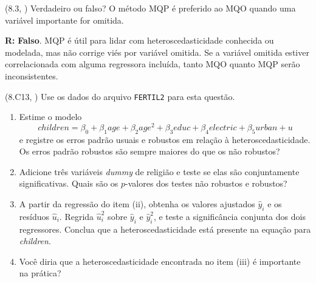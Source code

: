 \documentclass[12pt,letterpaper, onecolumn]{exam}
\renewenvironment{solution}
{\par\noindent\textbf{R:}\enspace\color{blue}}
{\par\color{black}}
\begin{document}
\begin{questions}
\vspace{0.7cm}

\question (8.3, \citep{wooldridge2016}) Verdadeiro ou falso? O método MQP é preferido ao MQO quando uma variável importante for omitida.

\begin{solution}
\textbf{Falso}. MQP é útil para lidar com heteroscedasticidade conhecida ou modelada, mas não corrige viés por variável omitida. Se a variável omitida estiver correlacionada com alguma regressora incluída, tanto MQO quanto MQP serão inconsistentes.
\end{solution}

\vspace{0.7cm}

\question\qstar (8.C13, \citep{wooldridge2016}) Use os dados do arquivo \texttt{FERTIL2} para esta questão.
\begin{enumerate}[label=(\roman*)]
    \item Estime o modelo
    \[
    children = \beta_0 + \beta_1 age + \beta_2 age^2 + \beta_3 educ + \beta_4 electric + \beta_5 urban + u
    \]
    e registre os erros padrão usuais e robustos em relação à heteroscedasticidade. Os erros padrão robustos são sempre maiores do que os não robustos?
    \item Adicione três variáveis \textit{dummy} de religião e teste se elas são conjuntamente significativas. Quais são os \(p\)-valores dos testes não robustos e robustos?
    \item A partir da regressão do item (ii), obtenha os valores ajustados \(\hat{y}_i\) e os resíduos \(\hat{u}_i\). Regrida \(\hat{u}_i^2\) sobre \(\hat{y}_i\) e \(\hat{y}_i^2\), e teste a significância conjunta dos dois regressores. Conclua que a heteroscedasticidade está presente na equação para \textit{children}.
    \item Você diria que a heteroscedasticidade encontrada no item (iii) é importante na prática?
\end{enumerate}

\end{questions}


\end{document}
